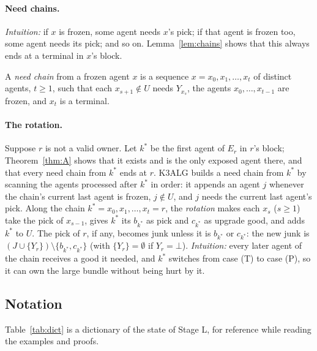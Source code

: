 \documentclass[runningheads,11pt]{llncs}
\newcommand{\none}{\bot}
\begin{document}
\paragraph{Need chains.} \emph{Intuition:} if $x$ is frozen, some agent needs $x$'s pick; if that agent is frozen too, some agent needs its pick; and so on. Lemma~\ref{lem:chains} shows that this always ends at a terminal in $x$'s block.

\begin{definition}\label{def:chain}
A \emph{need chain} from a frozen agent $x$ is a sequence $x=x_0,x_1,\dots,x_t$ of distinct agents, $t\ge1$, such that each $x_{s+1}\notin U$ needs $Y_{x_s}$, the agents $x_0,\dots,x_{t-1}$ are frozen, and $x_t$ is a terminal.
\end{definition}

\paragraph{The rotation.} Suppose $r$ is not a valid owner. Let $k^*$ be the first agent of $E_r$ in $r$'s block; Theorem~\ref{thm:A} shows that it exists and is the only exposed agent there, and that every need chain from $k^*$ ends at $r$. K3ALG builds a need chain from $k^*$ by scanning the agents processed after $k^*$ in order: it appends an agent $j$ whenever the chain's current last agent is frozen, $j\notin U$, and $j$ needs the current last agent's pick. Along the chain $k^*=x_0,x_1,\dots,x_t=r$, the \emph{rotation} makes each $x_s$ ($s\ge1$) take the pick of $x_{s-1}$, gives $k^*$ its $b_{k^*}$ as pick and $c_{k^*}$ as upgrade good, and adds $k^*$ to $U$. The pick of $r$, if any, becomes junk unless it is $b_{k^*}$ or $c_{k^*}$: the new junk is $(J\cup\{Y_r\})\setminus\{b_{k^*},c_{k^*}\}$ (with $\{Y_r\}=\emptyset$ if $Y_r=\none$). \emph{Intuition:} every later agent of the chain receives a good it needed, and $k^*$ switches from case (T) to case (P), so it can own the large bundle without being hurt by it.

\subsection{Notation}\label{sec:dict}

Table~\ref{tab:dict} is a dictionary of the state of Stage L, for reference while reading the examples and proofs.
\end{document}
